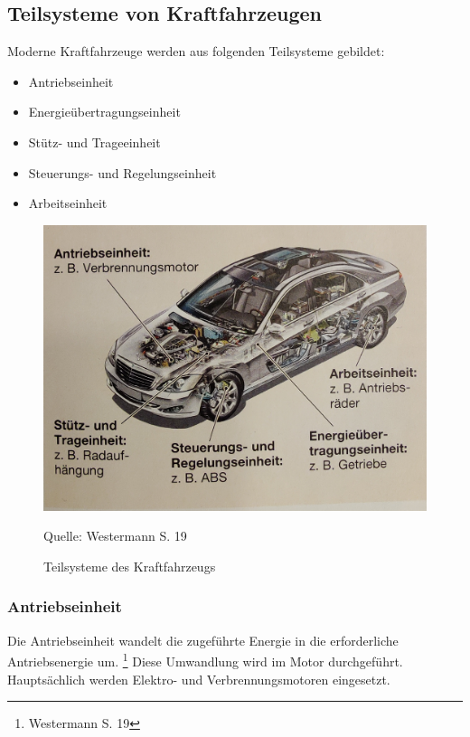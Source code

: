 \subsection{Teilsysteme von Kraftfahrzeugen}
Moderne Kraftfahrzeuge werden aus folgenden Teilsysteme gebildet:
\begin{itemize}
	\item Antriebseinheit
	\item Energieübertragungseinheit
	\item Stütz- und Trageeinheit
	\item Steuerungs- und Regelungseinheit
	\item Arbeitseinheit
\end{itemize}


\begin{figure}[!ht]
	\caption{Teilsysteme des Kraftfahrzeugs}
	\includegraphics[scale=0.1]{assets/figures/Teilsysteme des Kraftfahrzeugs.jpg}
	\begin{flushleft}
		Quelle: Westermann S. 19
	\end{flushleft}
	\label{fig:birds}
\end{figure}


\subsubsection{Antriebseinheit}
Die Antriebseinheit wandelt die zugeführte Energie in die erforderliche Antriebsenergie um.
\footnote{Westermann S. 19}
Diese Umwandlung wird im Motor durchgeführt.
Hauptsächlich werden Elektro- und Verbrennungsmotoren eingesetzt.

